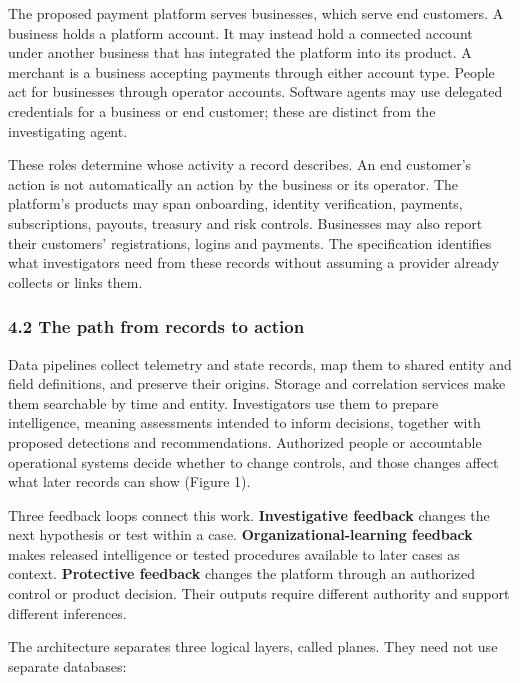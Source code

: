 \documentclass[
  11pt,
]{article}
\begin{document}
The proposed payment platform serves businesses, which serve end
customers. A business holds a platform account. It may instead hold a
connected account under another business that has integrated the
platform into its product. A merchant is a business accepting payments
through either account type. People act for businesses through operator
accounts. Software agents may use delegated credentials for a business
or end customer; these are distinct from the investigating agent.

These roles determine whose activity a record describes. An end
customer's action is not automatically an action by the business or its
operator. The platform's products may span onboarding, identity
verification, payments, subscriptions, payouts, treasury and risk
controls. Businesses may also report their customers' registrations,
logins and payments. The specification identifies what investigators
need from these records without assuming a provider already collects or
links them.

\hypertarget{the-path-from-records-to-action}{%
\subsubsection{4.2 The path from records to
action}\label{the-path-from-records-to-action}}

Data pipelines collect telemetry and state records, map them to shared
entity and field definitions, and preserve their origins. Storage and
correlation services make them searchable by time and entity.
Investigators use them to prepare intelligence, meaning assessments
intended to inform decisions, together with proposed detections and
recommendations. Authorized people or accountable operational systems
decide whether to change controls, and those changes affect what later
records can show (Figure 1).

Three feedback loops connect this work. \textbf{Investigative feedback}
changes the next hypothesis or test within a case.
\textbf{Organizational-learning feedback} makes released intelligence or
tested procedures available to later cases as context.
\textbf{Protective feedback} changes the platform through an authorized
control or product decision. Their outputs require different authority
and support different inferences.

\Needspace{170pt}

The architecture separates three logical layers, called planes. They
need not use separate databases:
\end{document}
